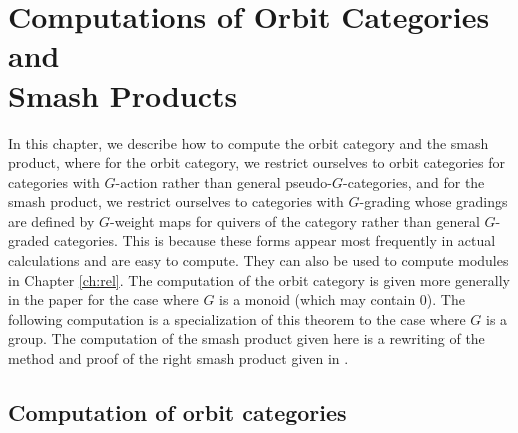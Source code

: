 \documentclass{surv-l}
\numberwithin{equation}{chapter}
\numberwithin{figure}{chapter}
\theoremstyle{plain}
\theoremstyle{definition}
\theoremstyle{remark}
\begin{document}


\chapter{Computations of Orbit Categories and\\ Smash Products}
\label{ch:compute}\label{ch:6}
In this chapter, we describe how to compute the orbit category and the smash product,
where for the orbit category, we restrict ourselves to orbit categories
for categories with $G$-action rather than general pseudo-$G$-categories,
and for the smash product, we restrict ourselves to categories with $G$-grading
whose gradings are defined by $G$-weight maps for quivers of the category
rather than general $G$-graded categories.
This is because these forms appear most frequently in actual calculations
and are easy to compute.
They can also be used to compute modules in Chapter \ref{ch:rel}.
The computation of the orbit category is given more generally in the paper \cite{Asa11}
for the case where $G$ is a monoid (which may contain 0).
The following computation is a specialization of this theorem to the case where $G$ is a group.
The computation of the smash product given here is a rewriting of the method and proof
of the right smash product given in \cite{Asa18}.

\section{Computation of orbit categories}
\end{document}
